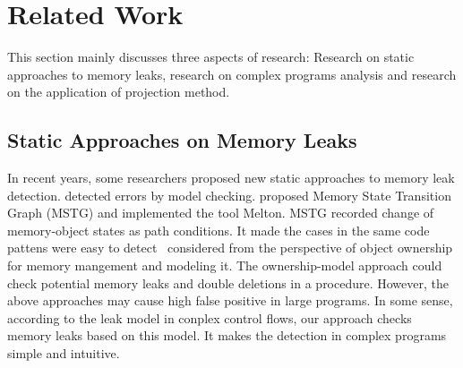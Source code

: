 \section{Related Work}\label{sec:related}
This section mainly discusses three aspects of research: Research on static approaches to memory leaks, research on complex programs analysis and research on the application of projection method.
\subsection{Static Approaches on Memory Leaks}

In recent years, some researchers proposed new static approaches to memory leak detection. \cite{XZX11,XZX15,HL06,YXYR14} detected errors by model checking. \cite{XZX11,XZX15} proposed Memory State Transition Graph (MSTG) and implemented the tool Melton. MSTG recorded change of memory-object states as path conditions. It made the cases in the same code pattens were easy to detect~\cite{HL06} considered from the perspective of object ownership for memory mangement and modeling it. The ownership-model approach could check potential memory leaks and double deletions in a procedure. However, the above approaches may cause high false positive in large programs. In some sense, according to the leak model in conplex control flows, our approach checks memory leaks based on this model. It makes the detection in complex programs simple and intuitive. 
 
